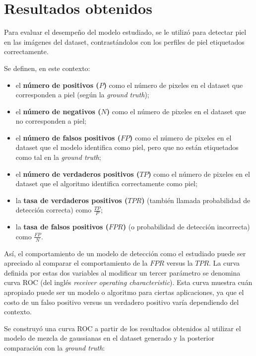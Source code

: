 \documentclass[12pt]{article}
\begin{document}
\section{Resultados obtenidos}

Para evaluar el desempeño del modelo estudiado, se le utilizó para detectar piel
en las imágenes del dataset, contrastándolos con los perfiles de piel
etiquetados correctamente. 

Se definen, en este contexto: 

\begin{itemize}
    \item el \textbf{número de positivos ($P$)} como el número de pixeles en el dataset
        que corresponden a piel (según la \emph{ground truth});
    \item el \textbf{número de negativos ($N$)} como el número de pixeles en el dataset
        que no corresponden a piel;
    \item el \textbf{número de falsos positivos ($FP$)} como el número de
        pixeles en el dataset que el modelo identifica como piel, pero que no
        están etiquetados como tal en la \emph{ground truth};
    \item el \textbf{número de verdaderos positivos ($TP$)} como el número de
        pixeles en el dataset que el algoritmo identifica correctamente como
        piel;
    \item la \textbf{tasa de verdaderos positivos ($TPR$)} (también llamada
        probabilidad de detección correcta) como $\frac{TP}{P}$;
    \item la \textbf{tasa de falsos positivos ($FPR$)} (o probabilidad de
        detección incorrecta) como $\frac{FP}{N}$.
\end{itemize}

Así, el comportamiento de un modelo de detección como el estudiado puede ser
apreciado al comparar el comportamiento de la $FPR$ versus la $TPR$. La curva
definida por estas dos variables al modificar un tercer parámetro se denomina curva
ROC (del inglés \emph{receiver operating characteristic}). Esta curva muestra
cuán apropiado puede ser un modelo o algoritmo para ciertas aplicaciones, ya que
el costo de un falso positivo versus un verdadero positivo varía dependiendo del
contexto.

Se construyó una curva ROC a partir de los resultados obtenidos al utilizar el modelo de mezcla
de gaussianas en el dataset generado y la posterior comparación con la
\emph{ground truth}:
\end{document}
